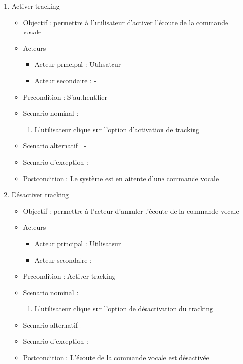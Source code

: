\begin{enumerate}[label=\alph*.]
	\item Activer tracking
	\begin{itemize}
		\item Objectif : permettre à l’utilisateur d’activer l’écoute de la commande vocale
		\item Acteurs :
		\begin{itemize}
			\item Acteur principal : Utilisateur
			\item Acteur secondaire : -
		\end{itemize}
		\item Précondition : S’authentifier
		\item Scenario nominal :
		\begin{enumerate}[label=\arabic*.]
			\item L’utilisateur clique sur l’option d’activation de tracking
		\end{enumerate}
		\item Scenario alternatif : -
		\item Scenario d’exception : -
		\item Postcondition : Le système est en attente d’une commande vocale
	\end{itemize}
	
	\item Désactiver tracking
	\begin{itemize}
		\item Objectif : permettre à l’acteur d’annuler l’écoute de la commande vocale
		\item Acteurs :
		\begin{itemize}
			\item Acteur principal : Utilisateur
			\item Acteur secondaire : -
		\end{itemize}
		\item Précondition : Activer tracking
		\item Scenario nominal :
		\begin{enumerate}[label=\arabic*.]
			\item L’utilisateur clique sur l’option de désactivation du tracking
		\end{enumerate}
		\item Scenario alternatif : -
		\item Scenario d’exception : -
		\item Postcondition : L’écoute de la commande vocale est désactivée
	\end{itemize}
	

\end{enumerate}
